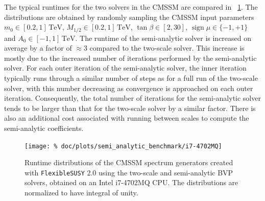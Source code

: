 \documentclass[final,3p,11pt,pdflatex]{elsarticle}
\makeatletter
\newcommand{\fs}{\texttt{FlexibleSUSY}\@\xspace}
\newcommand{\fstwo}{\fs 2.0\@\xspace}
\newcommand{\unit}[1]{\,\text{#1}}      %
\newcommand{\figref}[1]{\figurename~\ref{#1}}
\newcommand{\azero}{\ensuremath{A_0}\xspace}
\newcommand{\mhalf}{\ensuremath{M_{1/2}}\xspace}
\newcommand{\mzero}{\ensuremath{m_0}\xspace}
\DeclareMathOperator{\sign}{sign}
\makeatother
\begin{document}
The typical runtimes for the two solvers in the CMSSM are compared in
\figref{fig:semi_analytic_benchmark}.  The distributions are obtained
by randomly sampling the CMSSM input parameters
$\mzero\in [0.2,1]\unit{TeV}$, $\mhalf\in [0.2,1]\unit{TeV}$,
$\tan\beta\in [2,30]$, $\sign\mu\in\{-1,+1\}$ and
$\azero\in [-1,1]\unit{TeV}$.
The runtime of the semi-analytic solver is increased on average by a factor of
$\approx 3$ compared to the two-scale solver.  This increase is
mostly due to the increased number of iterations performed by the semi-analytic
solver.  For each outer iteration of the semi-analytic solver, the inner
iteration typically runs through a similar number of steps as for a full run
of the two-scale solver, with this number decreasing as convergence is
approached on each outer iteration.  Consequently, the total number of
iterations for the semi-analytic solver tends to be larger than that for the
two-scale solver by a similar factor.  There is also an additional cost
associated with running between scales to compute the semi-analytic
coefficients.
%
\begin{figure}[tbh]
  \centering
  \texttt{[image: \%
    doc/plots/semi\_analytic\_benchmark/i7-4702MQ]}
  \caption{Runtime distributions of the CMSSM spectrum generators created with
    \fstwo using the two-scale and semi-analytic BVP solvers, obtained on
    an Intel i7-4702MQ CPU\@.  The distributions are normalized to have integral
    of unity.}
\label{fig:semi_analytic_benchmark}
\end{figure}
\end{document}

